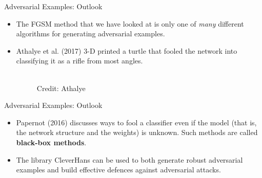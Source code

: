 \begin{frame} {Adversarial Examples: Outlook}
  \begin{itemize}
    \item The FGSM method that we have looked at is only one of \textit{many} different algorithms for generating adversarial examples.
    \item Athalye et al. (2017) 3-D printed a turtle that fooled the network into classifying it as a rifle from most angles.
    \begin{figure}
    \centering
      \tiny{\\Credit: Athalye}
  \end{figure}
\end{itemize}
\end{frame}

\begin{frame} {Adversarial Examples: Outlook}
  \begin{itemize}
    \item Papernot (2016) discusses ways to fool a classifier even if the model (that is, the network structure and the weights) is unknown. Such methods are called \textbf{black-box methods}.
    \item The library CleverHans can be used to both generate robust adversarial examples and build effective defences against adversarial attacks.
  \end{itemize}
\end{frame}






